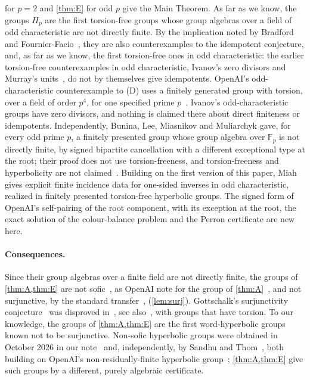 \documentclass[11pt]{article}
\theoremstyle{definition}
\theoremstyle{plain}
\newcommand{\F}{\mathbb{F}}
\begin{document}
\noindent {} for $p=2$ and \cref{thm:E} for odd $p$ give the Main Theorem. As far as we know, the groups $H_p$ are the first torsion-free groups whose group algebras over a field of odd characteristic are not directly finite. By the implication noted by Bradford and Fournier-Facio~\cite[\S1]{BFF2024}, they are also counterexamples to the idempotent conjecture, and, as far as we know, the first torsion-free ones in odd characteristic: the earlier torsion-free counterexamples in odd characteristic, Ivanov's zero divisors and Murray's units~\cite{Murray2021}, do not by themselves give idempotents. OpenAI's odd-characteristic counterexample to (D) uses a finitely generated group with torsion, over a field of order $p^4$, for one specified prime $p$~\cite[Thm.~1.1]{OAI197d}. Ivanov's odd-characteristic groups have zero divisors, and nothing is claimed there about direct finiteness or idempotents. Independently, Bunina, Lee, Miasnikov and Muliarchyk gave, for every odd prime $p$, a finitely presented group whose group algebra over $\F_p$ is not directly finite, by signed bipartite cancellation with a different exceptional type at the root; their proof does not use torsion-freeness, and torsion-freeness and hyperbolicity are not claimed~\cite[Thm.~1]{BLMM2026}. Building on the first version of this paper, Miah~\cite{Miah2026} gives explicit finite incidence data for one-sided inverses in odd characteristic, realized in finitely presented torsion-free hyperbolic groups. The signed form of OpenAI's self-pairing of the root component, with its exception at the root, the exact solution of the colour-balance problem and the Perron certificate are new here.

\paragraph{Consequences.} Since their group algebras over a finite field are not directly finite, the groups of \cref{thm:A,thm:E} are not sofic~\cite[Cor.~4.7]{ElekSzabo2004}, as OpenAI note for the group of \cref{thm:A}~\cite[\S1]{OAI197a}, and not surjunctive, by the standard transfer~\cite[\S1]{ElekSzabo2004}, \cite[Prop.~7.2]{OAI197b} (\cref{lem:surj}). Gottschalk's surjunctivity conjecture~\cite{Gottschalk1973} was disproved in~\cite{OAI197b}, see also~\cite{OAI197d}, with groups that have torsion. To our knowledge, the groups of \cref{thm:A,thm:E} are the first word-hyperbolic groups known not to be surjunctive. Non-sofic hyperbolic groups were obtained in October 2026 in our note~\cite{DouglasMghirbi2026} and, independently, by Sandhu and Thom~\cite{SandhuThom2026}, both building on OpenAI's non-residually-finite hyperbolic group~\cite{OAI252}; \cref{thm:A,thm:E} give such groups by a different, purely algebraic certificate.
\end{document}

